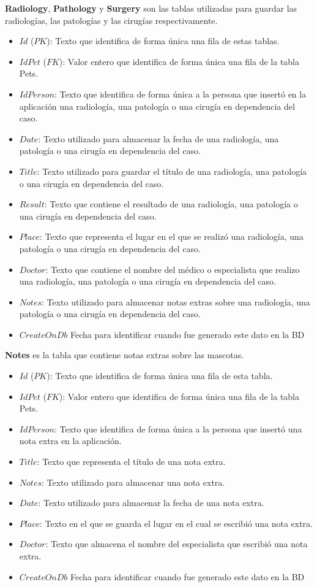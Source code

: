 \textbf{Radiology}, \textbf{Pathology} y \textbf{Surgery} son las tablas utilizadas para guardar las radiologías, las patologías y las cirugías respectivamente.


\begin{itemize}
	\item	$Id$ ($PK$): Texto que identifica de forma única una fila de estas tablas.
	\item	$IdPet$ ($FK$): Valor entero que identifica de forma única una fila de la tabla Pets.
	\item	$IdPerson$: Texto que identifica de forma única a la persona que insertó en la aplicación una radiología, una patología o una cirugía en dependencia del caso.
	\item	$Date$: Texto utilizado para almacenar la fecha de una radiología, una patología o una cirugía en dependencia del caso.
	\item	$Title$: Texto utilizado para guardar el título de una radiología, una patología o una cirugía en dependencia del caso.
	\item	$Result$: Texto que contiene el resultado de una radiología, una patología o una cirugía en dependencia del caso.
	\item	$Place$: Texto que representa el lugar en el que se realizó una radiología, una patología o una cirugía en dependencia del caso.
	\item	$Doctor$: Texto que contiene el nombre del médico o especialista que realizo una radiología, una patología o una cirugía en dependencia del caso.
	\item	$Notes$: Texto utilizado para almacenar notas extras sobre una radiología, una patología o una cirugía en dependencia del caso.
		\item	$CreateOnDb$ 
	Fecha para identificar cuando fue generado este dato en la BD
\end{itemize}


\textbf{Notes} es la tabla que contiene notas extras sobre las mascotas.


\begin{itemize}
	\item	$Id$ ($PK$): Texto que identifica de forma única una fila de esta tabla.
	\item	$IdPet$ ($FK$): Valor entero que identifica de forma única una fila de la tabla Pets.
	\item	$IdPerson$: Texto que identifica de forma única a la persona que insertó una nota extra en la aplicación.
	\item	$Title$: Texto que representa el título de una nota extra.
	\item	$Notes$: Texto utilizado para almacenar una nota extra.
	\item	$Date$: Texto utilizado para almacenar la fecha de una nota extra.
	\item	$Place$: Texto en el que se guarda el lugar en el cual se escribió una nota extra.
	\item	$Doctor$: Texto que almacena el nombre del especialista que escribió una nota extra.
	\item	$CreateOnDb$ 
Fecha para identificar cuando fue generado este dato en la BD
\end{itemize}


